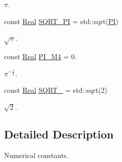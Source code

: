 \begin{DoxyCompactItemize}
\begin{DoxyCompactList}\small\item\em $ \pi $. \end{DoxyCompactList}\item 
\hypertarget{namespaceconstants_a0ebb82a72cc0395d173fba22dff4d8c0}{const \hyperlink{typedefs_8h_a060b837c3b4486ee35317744156f3da2}{Real} \hyperlink{namespaceconstants_a0ebb82a72cc0395d173fba22dff4d8c0}{S\-Q\-R\-T\-\_\-\-P\-I} = std\-::sqrt(\hyperlink{namespaceconstants_af5340fb69690fffd134dcae882754638}{P\-I})}\label{namespaceconstants_a0ebb82a72cc0395d173fba22dff4d8c0}

\begin{DoxyCompactList}\small\item\em $ \sqrt{\pi} $. \end{DoxyCompactList}\item 
\hypertarget{namespaceconstants_a3b733bd721f65dc9124f4fb15af3da5c}{const \hyperlink{typedefs_8h_a060b837c3b4486ee35317744156f3da2}{Real} \hyperlink{namespaceconstants_a3b733bd721f65dc9124f4fb15af3da5c}{P\-I\-\_\-\-M4} = 0.}\label{namespaceconstants_a3b733bd721f65dc9124f4fb15af3da5c}

\begin{DoxyCompactList}\small\item\em $ \pi^{-\frac{1}{4}} $. \end{DoxyCompactList}\item 
\hypertarget{namespaceconstants_ab0c53d0b9c422d694073f97eb185d292}{const \hyperlink{typedefs_8h_a060b837c3b4486ee35317744156f3da2}{Real} \hyperlink{namespaceconstants_ab0c53d0b9c422d694073f97eb185d292}{S\-Q\-R\-T\-\_} = std\-::sqrt(2)}\label{namespaceconstants_ab0c53d0b9c422d694073f97eb185d292}

\begin{DoxyCompactList}\small\item\em $ \sqrt{2} $. \end{DoxyCompactList}\end{DoxyCompactItemize}


\subsection{Detailed Description}
Numerical constants. 